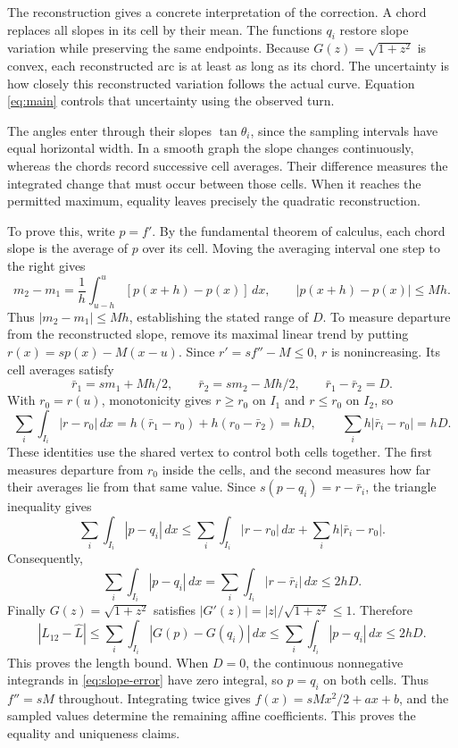 The reconstruction gives a concrete interpretation of the correction.
A chord replaces all slopes in its cell by their mean. The functions
$q_i$ restore slope variation while preserving the same endpoints.
Because $G(z)=\sqrt{1+z^2}$ is convex, each reconstructed arc is at
least as long as its chord. The uncertainty is how closely this
reconstructed variation follows the actual curve. Equation
\eqref{eq:main} controls that uncertainty using the observed turn.

The angles enter through their slopes $\tan\theta_i$, since the
sampling intervals have equal horizontal width. In a smooth graph the
slope changes continuously, whereas the chords record successive cell
averages. Their difference measures the integrated change that must
occur between those cells. When it reaches the permitted maximum,
equality leaves precisely the quadratic reconstruction.

To prove this, write $p=f'$. By the fundamental theorem of calculus,
each chord slope is the average of $p$ over its cell. Moving the
averaging interval one step to the right gives
\[
 m_2-m_1=\frac1h\int_{u-h}^{u}[p(x+h)-p(x)]\,dx,
 \qquad |p(x+h)-p(x)|\le Mh.
\]
Thus $|m_2-m_1|\le Mh$, establishing the stated range of $D$.
To measure departure from the reconstructed slope, remove its maximal
linear trend by putting
$r(x)=sp(x)-M(x-u)$. Since $r'=sf''-M\le0$, $r$ is nonincreasing.
Its cell averages satisfy
\[
 \bar r_1=sm_1+Mh/2,\qquad \bar r_2=sm_2-Mh/2,
 \qquad \bar r_1-\bar r_2=D.
\]
With $r_0=r(u)$, monotonicity gives $r\ge r_0$ on $I_1$ and
$r\le r_0$ on $I_2$, so
\[
 \sum_i\int_{I_i}|r-r_0|\,dx
 =h(\bar r_1-r_0)+h(r_0-\bar r_2)=hD,
 \qquad \sum_i h|\bar r_i-r_0|=hD.
\]
These identities use the shared vertex to control both cells together.
The first measures departure from $r_0$ inside the cells, and the second
measures how far their averages lie from that same value. Since
$s(p-q_i)=r-\bar r_i$, the triangle inequality gives
\[
 \sum_i\int_{I_i}|p-q_i|\,dx
 \le\sum_i\int_{I_i}|r-r_0|\,dx
       +\sum_i h|\bar r_i-r_0|.
\]
Consequently,
\begin{equation}\label{eq:slope-error}
 \sum_i\int_{I_i}|p-q_i|\,dx
 =\sum_i\int_{I_i}|r-\bar r_i|\,dx\le2hD.
\end{equation}
Finally $G(z)=\sqrt{1+z^2}$ satisfies
$|G'(z)|=|z|/\sqrt{1+z^2}\le1$. Therefore
\[
 |L_{12}-\widehat L|
 \le\sum_i\int_{I_i}|G(p)-G(q_i)|\,dx
 \le\sum_i\int_{I_i}|p-q_i|\,dx\le2hD.
\]
This proves the length bound. When $D=0$, the continuous nonnegative
integrands in \eqref{eq:slope-error} have zero integral, so $p=q_i$
on both cells. Thus $f''=sM$ throughout. Integrating twice gives
$f(x)=sMx^2/2+ax+b$, and the sampled values determine the remaining
affine coefficients. This proves the equality and uniqueness claims.

